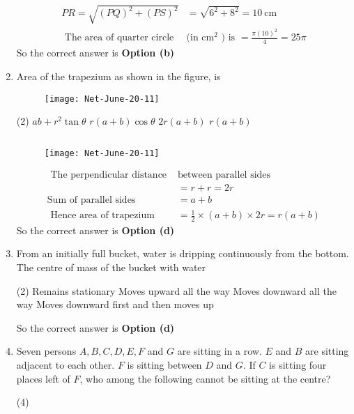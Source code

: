 \begin{enumerate}
\begin{answer}
\begin{align*}
	P R=\sqrt{(P Q)^{2}+(P S)^{2}}&=\sqrt{6^{2}+8^{2}}=10 \mathrm{~cm}\\
\text{	The area of quarter circle }&\text{(in $\mathrm{cm}^{2}$ ) is $=\frac{\pi(10)^{2}}{4}=25 \pi$}
	\end{align*}
		So the correct answer is \textbf{Option (b)}
\end{answer}
\item Area of the trapezium as shown in the figure, is	
	\begin{figure}[H]
	\centering
	\texttt{[image: Net-June-20-11]}
\end{figure}
 \begin{tasks}(2)
	\task[\textbf{a.}]$a b+r^{2} \tan \theta$
	\task[\textbf{b.}]$r(a+b) \cos \theta$
	\task[\textbf{c.}]$2 r(a+b)$
	\task[\textbf{d.}] $r(a+b)$
\end{tasks}
\begin{answer}$\left. \right. $
		\begin{figure}[H]
		\centering
		\texttt{[image: Net-June-20-11]}
	\end{figure}
	\begin{align*}
\text{ The perpendicular distance }&\text{between parallel sides }\\
&=r+r=2 r\\
	\text{Sum of parallel sides }&=a+b\\
\text{	Hence area of trapezium }&=\frac{1}{2} \times(a+b) \times 2 r=r(a+b)
	\end{align*}
		So the correct answer is \textbf{Option (d)}
\end{answer}
\item From an initially full bucket, water is dripping continuously from the bottom. The centre of mass of the bucket with water
 \begin{tasks}(2)
	\task[\textbf{a.}]Remains stationary
	\task[\textbf{b.}]Moves upward all the way
	\task[\textbf{c.}]Moves downward all the way
	\task[\textbf{d.}]Moves downward first and then moves up
\end{tasks}
\begin{answer}
		So the correct answer is \textbf{Option (d)}
\end{answer}
\item Seven persons $A, B, C, D, E, F$ and $G$ are sitting in a row. $E$ and $B$ are sitting adjacent to each other. $F$ is sitting between $D$ and $G$. If $C$ is sitting four places left of $F$, who among the following cannot be sitting at the centre?
 \begin{tasks}(4)

\end{tasks}
\end{enumerate}
